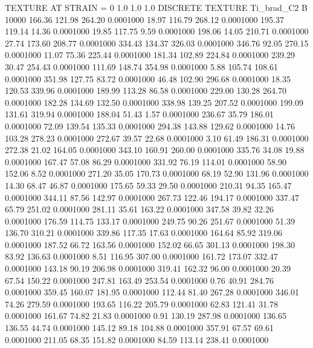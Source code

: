 TEXTURE AT STRAIN = 0
1.0   1.0   1.0
DISCRETE TEXTURE Ti_brad_C2
B 10000
 166.36  121.98  264.20   0.0001000
  18.97  116.79  268.12   0.0001000
 195.37  119.14   14.36   0.0001000
  19.85  117.75    9.59   0.0001000
 198.06   14.05  210.71   0.0001000
  27.74  173.60  208.77   0.0001000
 334.43  134.37  326.03   0.0001000
 346.76   92.05  270.15   0.0001000
  11.07   75.36  225.44   0.0001000
 181.34  102.89  224.84   0.0001000
 239.29   30.47  254.43   0.0001000
 111.69  148.74  354.98   0.0001000
   5.88  105.74  108.61   0.0001000
 351.98  127.75   83.72   0.0001000
  46.48  102.90  296.68   0.0001000
  18.35  120.53  339.96   0.0001000
 189.99  113.28   86.58   0.0001000
 229.00  130.28  264.70   0.0001000
 182.28  134.69  132.50   0.0001000
 338.98  139.25  207.52   0.0001000
 199.09  131.61  319.94   0.0001000
 188.04   51.43    1.57   0.0001000
 236.67   35.79  186.01   0.0001000
  72.09  139.54  135.33   0.0001000
 294.38  143.88  129.62   0.0001000
  14.76  103.28  278.23   0.0001000
 272.67   39.57   22.68   0.0001000
   3.10   61.49  186.31   0.0001000
 272.38   21.02  164.05   0.0001000
 343.10  160.91  260.00   0.0001000
 335.76   34.08   19.88   0.0001000
 167.47   57.08   86.29   0.0001000
 331.92   76.19  114.01   0.0001000
  58.90  152.06    8.52   0.0001000
 271.20   35.05  170.73   0.0001000
  68.19   52.90  131.96   0.0001000
  14.30   68.47   46.87   0.0001000
 175.65   59.33   29.50   0.0001000
 210.31   94.35  165.47   0.0001000
 344.11   87.56  142.97   0.0001000
 267.73  122.46  194.17   0.0001000
 337.47   65.79  251.02   0.0001000
 281.11   35.61  163.22   0.0001000
 347.58   39.82   32.26   0.0001000
 176.59  114.75  133.17   0.0001000
 249.75   90.26  251.67   0.0001000
  51.39  136.70  310.21   0.0001000
 339.86  117.35   17.63   0.0001000
 164.64   85.92  319.06   0.0001000
 187.52   66.72  163.56   0.0001000
 152.02   66.65  301.13   0.0001000
 198.30   83.92  136.63   0.0001000
   8.51  116.95  307.00   0.0001000
 161.72  173.07  332.47   0.0001000
 143.18   90.19  206.98   0.0001000
 319.41  162.32   96.00   0.0001000
  20.39   67.54  150.22   0.0001000
 247.81  163.49  253.54   0.0001000
   0.76   40.91  284.76   0.0001000
 359.45  160.07  181.95   0.0001000
 112.44   81.40  267.28   0.0001000
 346.01   74.26  279.59   0.0001000
 193.65  116.22  205.79   0.0001000
  62.83  121.41   31.78   0.0001000
 161.67   74.82   21.83   0.0001000
   0.91  130.19  287.98   0.0001000
 136.65  136.55   44.74   0.0001000
 145.12   89.18  104.88   0.0001000
 357.91   67.57   69.61   0.0001000
 211.05   68.35  151.82   0.0001000
  84.59  113.14  238.41   0.0001000
